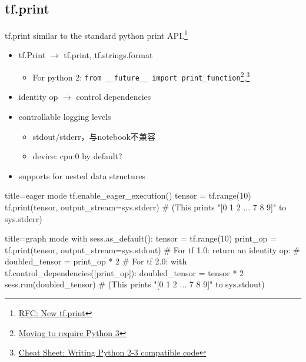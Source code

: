 
\subsection{tf.print}
\begin{frame}{tf.print}
    similar to the standard python print API.\footnote{\href{https://github.com/tensorflow/community/pull/14}{RFC: New tf.print}}

    \begin{itemize}
        \item tf.Print $\to$ tf.print, tf.strings.format
            \begin{itemize}
                \item For python 2: \lstinline{from __future__ import print_function}\footnote{\href{https://python3statement.org/\#sections40-timeline}{Moving to require Python 3}},\footnote{\href{http://python-future.org/compatible\_idioms.html}{Cheat Sheet: Writing Python 2-3 compatible code}}
            \end{itemize}
        \item identity op $\to$ control dependencies
        \item controllable logging levels
            \begin{itemize}
                \item stdout/stderr，与notebook不兼容
                \item device: cpu:0 by default?
            \end{itemize}
        \item supports for nested data structures
    \end{itemize}
\end{frame}

\begin{frame}[fragile]
    \begin{tcblisting}{title=eager mode}
        tf.enable_eager_execution()
        tensor = tf.range(10)
        tf.print(tensor, output_stream=sys.stderr)
        # (This prints "[0 1 2 ... 7 8 9]" to sys.stderr)
    \end{tcblisting}

    \begin{tcblisting}{title=graph mode}
        with sess.as_default():
          tensor = tf.range(10)
          print_op = tf.print(tensor, output_stream=sys.stdout)
          # For tf 1.0: return an identity op:
          # doubled_tensor = print_op * 2
          # For tf 2.0:
          with tf.control_dependencies([print_op]):
            doubled_tensor = tensor * 2
          sess.run(doubled_tensor)
          # (This prints "[0 1 2 ... 7 8 9]" to sys.stdout)
    \end{tcblisting}
\end{frame}
